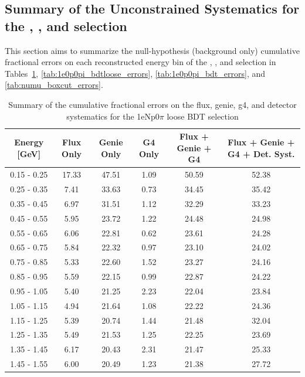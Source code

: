 \subsection{Summary of the Unconstrained Systematics for the \npsel, \zpsel, and \numu selection}
\label{subsec:syst:syst_table}

This section aims to summarize the null-hypothesis (background only) cumulative fractional errors on each reconstructed energy bin of the \npsel, \zpsel, and \numu selection in Tables~\ref{tab:1eNp0pi_bdt_errors}, \ref{tab:1e0p0pi_bdtloose_errors}, \ref{tab:1e0p0pi_bdt_errors}, and \ref{tab:numu_boxcut_errors}. 

\begin{table}[H]
\centering
\begin{tabular}{| c | c | c | c | c | c |}
\hline
Energy [GeV] & Flux Only & Genie Only  & G4 Only & Flux + Genie + G4 & Flux + Genie + G4 + Det. Syst. \\
\hline
0.15 - 0.25 & 17.33 & 47.51 & 1.09 & 50.59 & 52.38 \\
0.25 - 0.35 & 7.41 & 33.63 & 0.73 & 34.45 & 35.42 \\
0.35 - 0.45 & 6.97 & 31.51 & 1.12 & 32.29 & 33.23 \\
0.45 - 0.55 & 5.95 & 23.72 & 1.22 & 24.48 & 24.98 \\
0.55 - 0.65 & 6.06 & 22.81 & 0.62 & 23.61 & 24.28 \\
0.65 - 0.75 & 5.84 & 22.32 & 0.97 & 23.10 & 24.02 \\
0.75 - 0.85 & 5.33 & 22.60 & 1.52 & 23.27 & 24.16 \\
0.85 - 0.95 & 5.59 & 22.15 & 0.99 & 22.87 & 24.22 \\
0.95 - 1.05 & 5.40 & 21.25 & 2.23 & 22.04 & 23.84 \\
1.05 - 1.15 & 4.94 & 21.64 & 1.08 & 22.22 & 24.36 \\
1.15 - 1.25 & 5.39 & 20.74 & 1.44 & 21.48 & 32.04 \\
1.25 - 1.35 & 5.49 & 21.53 & 1.25 & 22.25 & 23.69 \\
1.35 - 1.45 & 6.17 & 20.43 & 2.31 & 21.47 & 25.33 \\
1.45 - 1.55 & 6.00 & 20.49 & 1.23 & 21.38 & 27.72 \\
\hline
\end{tabular}
\caption{Summary of the cumulative fractional errors on the flux, genie, g4, and detector systematics for the 1eNp0$\pi$ loose BDT selection}
\label{tab:1eNp0pi_bdt_errors}
\end{table}


